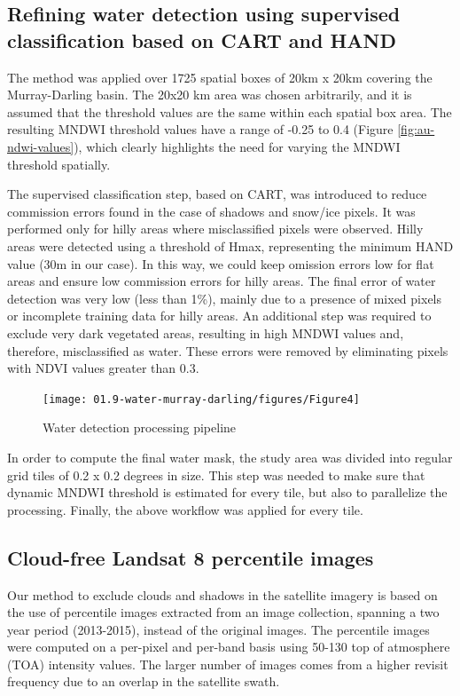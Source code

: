 \subsection{Refining water detection using supervised classification based on CART and HAND}
The method was applied over 1725 spatial boxes of 20km x 20km covering the Murray-Darling basin. The 20x20 km area was chosen arbitrarily, and it is assumed that the threshold values are the same within each spatial box area. The resulting MNDWI threshold values have a range of -0.25 to 0.4 (Figure \ref{fig:au-ndwi-values}), which clearly highlights the need for varying the MNDWI threshold spatially. 

The supervised classification step, based on CART, was introduced to reduce commission errors found in the case of shadows and snow/ice pixels. It was performed only for hilly areas where misclassified pixels were observed. Hilly areas were detected using a threshold of Hmax, representing the minimum HAND value (30m in our case). In this way, we could keep omission errors low for flat areas and ensure low commission errors for hilly areas. The final error of water detection was very low (less than 1\%), mainly due to a presence of mixed pixels or incomplete training data for hilly areas. An additional step was required to exclude very dark vegetated areas, resulting in high MNDWI values and, therefore, misclassified as water. These errors were removed by eliminating pixels with NDVI values greater than 0.3.

\begin{figure}
	\centering
	\texttt{[image: 01.9-water-murray-darling/figures/Figure4]}
	\caption{Water detection processing pipeline}
	\label{fig:au-pipeline}
\end{figure}

In order to compute the final water mask, the study area was divided into regular grid tiles of 0.2 x 0.2 degrees in size. This step was needed to make sure that dynamic MNDWI threshold is estimated for every tile, but also to parallelize the processing. Finally, the above workflow was applied for every tile.

\subsection{Cloud-free Landsat 8 percentile images}
Our method to exclude clouds and shadows in the satellite imagery is based on the use of percentile images extracted from an image collection, spanning a two year period (2013-2015), instead of the original images. The percentile images were computed on a per-pixel and per-band basis using 50-130 top of atmosphere (TOA) intensity values. The larger number of images comes from a higher revisit frequency due to an overlap in the satellite swath. 

